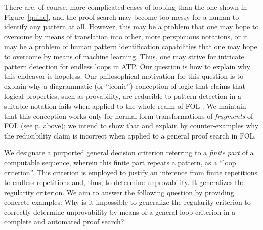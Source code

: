 \documentclass[%
  manuscript=article,   %
  year=2024,
  volume=77,
  doi=10.59203/zfn.77.694,
]{zfn}
\begin{document}
There are, of course, more complicated cases of looping than the one shown in Figure~\ref{quine}, and the proof search may become too messy for a human to identify any pattern at all. However, this may be a problem that one may hope to overcome by means of translation into other, more perspicuous notations, or it may be a problem of human pattern identification capabilities that one may hope to overcome by means of machine learning. Thus, one may strive for intricate pattern detection for endless loops in ATP.
Our question is how to explain why this endeavor is hopeless.
Our philosophical motivation for this question is to explain why a diagrammatic (or ``iconic'')
conception of logic that claims that logical properties, such as provability, are reducible to pattern detection in a suitable notation fails when applied to the whole realm of FOL \parencite[cf.][for details about this diagrammatic (or iconic) conception of logic, which is based on insights from Wittgenstein's early work]{Lampert3}. We maintain that this conception works only for normal form transformations of \emph{fragments} of FOL (see p. \pageref{normalforms} above); we intend to show that and explain by counter-examples why the reducibility claim is incorrect when applied to a general proof search in FOL.


We designate a purported general decision criterion referring to a \emph{finite part} of a computable sequence, wherein this finite part repeats a pattern, as a ``loop criterion''. This criterion is employed to justify an inference from finite repetitions to endless repetitions and, thus, to determine unprovability. It generalizes the regularity criterion. We aim to answer the following question by providing concrete examples: Why is it impossible to generalize the regularity criterion to correctly determine unprovability by means of a general loop criterion in a complete and automated proof search?
\end{document}
